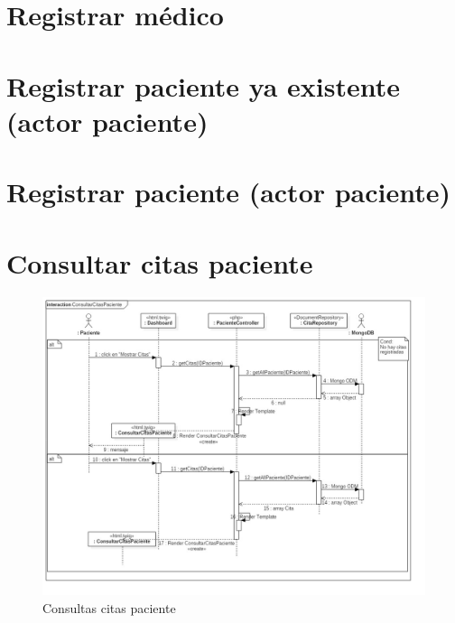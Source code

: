 \section{Registrar médico}

\section{Registrar paciente ya existente (actor paciente)}

\section{Registrar paciente (actor paciente)}


\section{Consultar citas paciente}
	\begin{figure}[htbp!]
		\centering
			\includegraphics[width=1\textwidth]{uml/DiagramasSecuencia/DemisGomez/consultarCitasPaciente}
		\caption{Consultas citas paciente}
	\end{figure}
	\newpage
